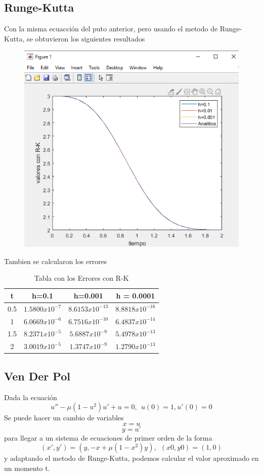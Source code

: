 \documentclass[12pt]{article}
\begin{document}
\subsection{Runge-Kutta}
Con la misma ecuacción del puto anterior, pero usando el metodo de Runge-Kutta, se obtuvieron los siguientes resultados
\begin{figure}[h]
	\centering
	\caption{}
	\includegraphics[scale=0.45]{graf4.png}
	\label{graf4}
\end{figure}
\newpage
Tambien se calcularon los errores
\begin{table}[h]
	\centering
	\begin{tabular}{|c|c|c|c|}
		\hline
		t & h=0.1 & h=0.001 & h = 0.0001 \\
		\hline
		0.5&$1.5800x10^{-7}$&$8.6153x10^{-13}$&$8.8818x10^{-16}$\\
		\hline
		1&$6.0669x10^{-6}$&$6.7516x10^{-10}$&$6.4837x10^{-14}$\\
		\hline
		1.5&$8.2371x10^{-5}$&$5.6887x10^{-9}$&$5.4978x10^{-13}$\\
		\hline
		2&$3.0019x10^{-5}$&$1.3747x10^{-9}$&$1.2790x10^{-13}$\\
		\hline
	\end{tabular}
	\caption{Tabla con los Errores con R-K}
	\label{table4}
\end{table}
\subsection{Ven Der Pol}
Dada la ecuación
\begin{equation}
	u''-\mu(1-u^2)u'+u=0,~~u(0)=1, u'(0)=0
	\label{Pol}
\end{equation}
Se puede hacer un cambio de variables $$x = u$$$$y = u'$$
para llegar a un sistema de ecuaciones de primer orden de la forma $$(x',y') = (y, -x+\mu(1-x^2)y),~~(x0,y0)=(1,0)$$ y adaptando el metodo de Runge-Kutta, podemos calcular el valor aproximado en un momento t.
\end{document}
